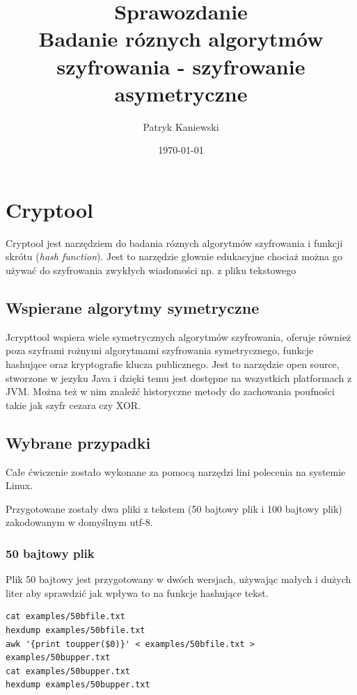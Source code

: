 \documentclass[11pt]{article}
\author{Patryk Kaniewski}
\date{\today}
\title{Sprawozdanie \\
Badanie róznych algorytmów szyfrowania - szyfrowanie asymetryczne}
\begin{document}
\maketitle
\tableofcontents \clearpage

\section{Cryptool}
\label{sec:org30aa986}
Cryptool jest narzędziem do badania róznych algorytmów szyfrowania i funkcji skrótu (\emph{hash function}). Jest to narzędzie głownie edukacyjne chociaż można go używać do szyfrowania zwykłych wiadomości np. z pliku tekstowego

\subsection{Wspierane algorytmy symetryczne}
\label{sec:org8e3c720}
Jcrypttool wspiera wiele symetrycznych algorytmów szyfrowania, oferuje również poza szyframi rożnymi algorytmami szyfrowania symetrycznego, funkcje hashujące oraz kryptografie klucza publicznego. Jest to narzędzie open source, stworzone w jezyku Java i dzięki temu jest dostępne na wszystkich platformach z JVM. Można też w nim znaleźć historyczne metody do zachowania poufności takie jak szyfr cezara czy XOR.


\subsection{Wybrane przypadki}
\label{sec:orgec8fab8}
Całe ćwiczenie zostało wykonane za pomocą narzędzi lini polecenia na systemie Linux.

Przygotowane zostały dwa pliki z tekstem (50 bajtowy plik i 100 bajtowy plik) zakodowanym w domyślnym utf-8.

\subsubsection{50 bajtowy plik}
\label{sec:org2c115eb}
Plik 50 bajtowy jest przygotowany w dwóch wersjach, używając małych i dużych liter aby sprawdzić jak wpływa to na funkcje hashujące tekst.
\begin{verbatim}
cat examples/50bfile.txt
hexdump examples/50bfile.txt
awk '{print toupper($0)}' < examples/50bfile.txt > examples/50bupper.txt
cat examples/50bupper.txt
hexdump examples/50bupper.txt
\end{verbatim}
\end{document}
